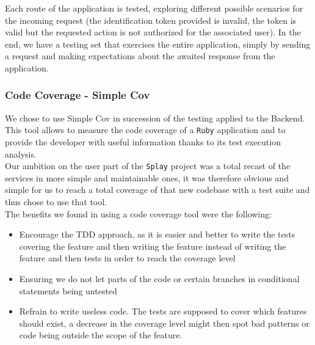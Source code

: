 \documentclass{eplmastersthesis}
\begin{document}
          Each route of the application is tested, exploring different possible
          scenarios for the incoming request (the identification token provided
          is invalid, the token is valid but the requested action is not
          authorized for the associated user). In the end, we have a testing set
          that exercises the entire application, simply by sending a request and
          making expectations about the awaited response from the application.

        \subsubsection{Code Coverage - Simple Cov}

          We chose to use Simple Cov in succession of the testing applied to
          the Backend. This tool allows to measure the code coverage of a \texttt{Ruby}
          application and to provide the developer with useful information
          thanks to its test execution analysis.\\

          Our ambition on the user part of the \texttt{Splay} project was a total recast of
          the services in more simple and maintainable ones, it was therefore
          obvious and simple for us to reach a total coverage of that new codebase
          with a test suite and thus chose to use that tool.\\

          The benefits we found in using a code coverage tool were the
          following:

          \begin{itemize}
            \item Encourage the TDD approach, as it is easier and better to
            write the tests covering the feature and then writing the feature
            instead of writing the feature and then tests in order to reach
            the coverage level
            \item Ensuring we do not let parts of the code or certain branches
            in conditional statements being untested
            \item Refrain to write useless code. The tests are supposed to cover
            which features should exist, a decrease in the coverage level
            might then spot bad patterns or code being outside the scope
            of the feature.
          \end{itemize}
\end{document}
